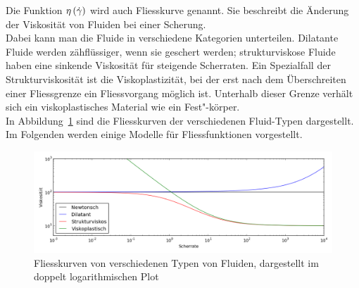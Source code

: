 Die Funktion $\eta\left( \dot\gamma \right)$ wird auch Fliesskurve genannt. Sie beschreibt die Änderung der Viskosität von Fluiden bei einer Scherung.\\
Dabei kann man die Fluide in verschiedene Kategorien unterteilen. Dilatante Fluide werden zähflüssiger, wenn sie geschert werden; strukturviskose Fluide haben eine sinkende Viskosität für steigende Scherraten.
Ein Spezialfall der Strukturviskosität ist die Viskoplastizität, bei der erst nach dem Überschreiten einer Fliessgrenze ein Fliessvorgang möglich ist. Unterhalb dieser Grenze verhält sich ein viskoplastisches Material wie ein Fest"-körper.\\
In Abbildung~\ref{fig:fliessKurven} sind die Fliesskurven der verschiedenen Fluid-Typen dargestellt. Im Folgenden werden einige Modelle für Fliessfunktionen vorgestellt. 
%
%
\begin{figure}
    \centering
    \includegraphics[width=\textwidth]{figures/Fliesskurven.png}
    \caption{Fliesskurven von verschiedenen Typen von Fluiden, dargestellt im doppelt logarithmischen Plot}
    \label{fig:fliessKurven}
\end{figure}
%
